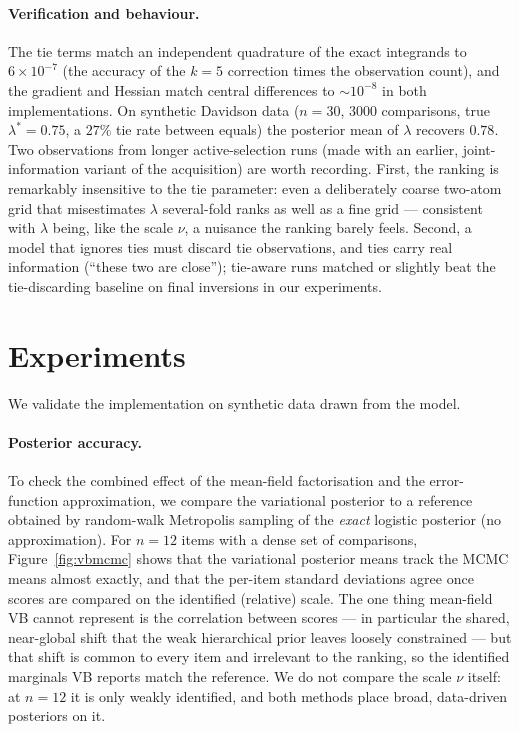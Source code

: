 \documentclass[12pt]{article}
\begin{document}
\paragraph{Verification and behaviour.}
The tie terms match an independent quadrature of the exact integrands to $6\times10^{-7}$ (the
accuracy of the $k=5$ correction times the observation count), and the gradient and Hessian match
central differences to $\sim10^{-8}$ in both implementations. On synthetic Davidson data
($n = 30$, $3000$ comparisons, true $\lambda^\ast = 0.75$, a $27\%$ tie rate between equals) the
posterior mean of $\lambda$ recovers $0.78$. Two observations from longer active-selection runs
(made with an earlier, joint-information variant of the acquisition) are worth recording. First, the ranking is remarkably insensitive to the tie parameter: even a
deliberately coarse two-atom grid that misestimates $\lambda$ several-fold ranks as well as a fine
grid --- consistent with $\lambda$ being, like the scale $\nu$, a nuisance the ranking barely
feels. Second, a model that ignores ties must discard tie observations, and ties carry real
information (``these two are close''); tie-aware runs matched or slightly beat the tie-discarding
baseline on final inversions in our experiments.

\section{Experiments}
\label{sec:experiments}

We validate the implementation on synthetic data drawn from the model.

\paragraph{Posterior accuracy.}
To check the combined effect of the mean-field factorisation and the error-function
approximation, we compare the variational posterior to a reference obtained by random-walk
Metropolis sampling of the \emph{exact} logistic posterior (no approximation). For $n = 12$
items with a dense set of comparisons, Figure~\ref{fig:vbmcmc} shows that the variational
posterior means track the MCMC means almost exactly, and that the per-item standard deviations
agree once scores are compared on the identified (relative) scale. The one thing mean-field VB
cannot represent is the correlation between scores --- in particular the shared, near-global shift
that the weak hierarchical prior leaves loosely constrained --- but that shift is common to every
item and irrelevant to the ranking, so the identified marginals VB reports match the reference.
We do not compare the scale $\nu$ itself: at $n = 12$ it is only weakly identified, and both
methods place broad, data-driven posteriors on it.
\end{document}
